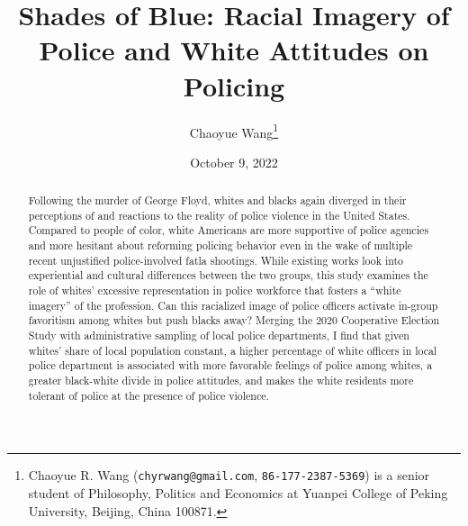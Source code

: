 \documentclass[
  12pt,
]{article}
\title{Shades of Blue: Racial Imagery of Police and White Attitudes on
Policing}
\author{Chaoyue Wang\footnote{Chaoyue R. Wang
  (\texttt{chyrwang@gmail.com}, \texttt{86-177-2387-5369}) is a senior
  student of Philosophy, Politics and Economics at Yuanpei College of
  Peking University, Beijing, China 100871.}}
\date{October 9, 2022}
\begin{document}
\maketitle


\thispagestyle{empty}

\begin{abstract}  \onehalfspacing
\begin{normalsize}  \noindent 
Following the murder of George Floyd, whites and blacks again diverged
in their perceptions of and reactions to the reality of police violence
in the United States. Compared to people of color, white Americans are
more supportive of police agencies and more hesitant about reforming
policing behavior even in the wake of multiple recent unjustified
police-involved fatla shootings. While existing works look into
experiential and cultural differences between the two groups, this study
examines the role of whites' excessive representation in police
workforce that fosters a ``white imagery'' of the profession. Can this
racialized image of police officers activate in-group favoritism among
whites but push blacks away? Merging the 2020 Cooperative Election Study
with administrative sampling of local police departments, I find that
given whites' share of local population constant, a higher percentage of
white officers in local police department is associated with more
favorable feelings of police among whites, a greater black-white divide
in police attitudes, and makes the white residents more tolerant of
police at the presence of police violence.
\end{normalsize}
\end{abstract}

\begin{quote}
\end{quote}

\newpage \clearpage {}\captionsetup{labelfont = bf, font = small}




\ifdefined\Shaded\renewenvironment{Shaded}{\begin{tcolorbox}[enhanced, boxrule=0pt, breakable, sharp corners, interior hidden, borderline west={3pt}{0pt}{shadecolor}, frame hidden]}{\end{tcolorbox}}\fi
\end{document}
